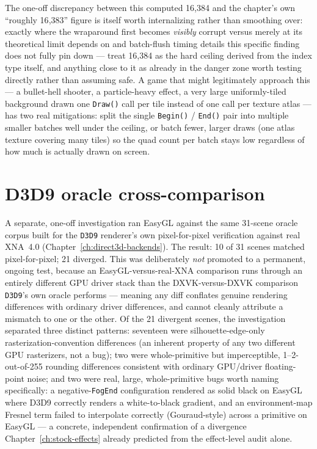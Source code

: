The one-off discrepancy between this computed 16{,}384 and the chapter's own ``roughly
16{,}383'' figure is itself worth internalizing rather than smoothing over: exactly where the
wraparound first becomes \emph{visibly} corrupt versus merely at its theoretical limit depends
on  and batch-flush timing details this specific finding does not
fully pin down --- treat 16{,}384 as the hard ceiling derived from the index type itself, and
anything close to it as already in the danger zone worth testing directly rather than assuming
safe. A game that might legitimately approach this --- a bullet-hell shooter, a particle-heavy
effect, a very large uniformly-tiled background drawn one \texttt{Draw()} call per tile
instead of one call per texture atlas --- has two real mitigations: split the single
 \texttt{Begin()} / \texttt{End()} pair into multiple smaller batches well
under the ceiling, or batch fewer, larger draws (one atlas texture covering many tiles) so the
quad count per batch stays low regardless of how much is actually drawn on screen.

\section{D3D9 oracle cross-comparison}

A separate, one-off investigation ran EasyGL against the same 31-scene oracle corpus built
for the \texttt{D3D9} renderer's own pixel-for-pixel verification against real XNA~4.0
(Chapter~\ref{ch:direct3d-backends}). The result: 10 of 31 scenes matched pixel-for-pixel;
21 diverged. This was deliberately \emph{not} promoted to a permanent, ongoing test, because
an EasyGL-versus-real-XNA comparison runs through an entirely different GPU driver stack than
the DXVK-versus-DXVK comparison \texttt{D3D9}'s own oracle performs --- meaning any diff
conflates genuine rendering differences with ordinary driver differences, and cannot cleanly
attribute a mismatch to one or the other. Of the 21 divergent scenes, the investigation
separated three distinct patterns: seventeen were silhouette-edge-only rasterization-convention
differences (an inherent property of any two different GPU rasterizers, not a bug);
two were whole-primitive but imperceptible, 1--2-out-of-255 rounding differences consistent
with ordinary GPU/driver floating-point noise; and two were real, large, whole-primitive
bugs worth naming specifically: a negative-\texttt{FogEnd} configuration rendered as solid
black on EasyGL where D3D9 correctly renders a white-to-black gradient, and an
environment-map Fresnel term failed to interpolate correctly (Gouraud-style) across a
primitive on EasyGL --- a concrete, independent confirmation of a divergence
Chapter~\ref{ch:stock-effects} already predicted from the effect-level audit alone.

